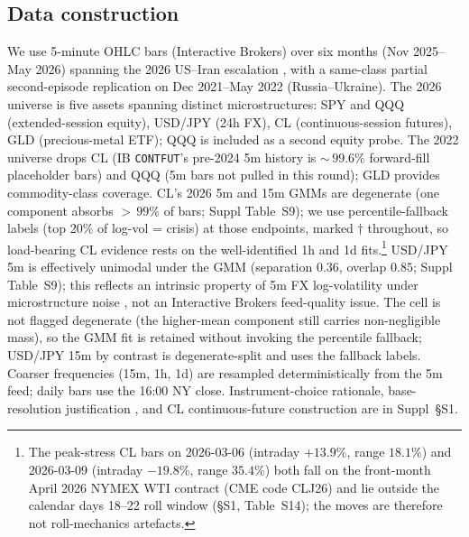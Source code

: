 \documentclass[preprint,12pt,authoryear]{elsarticle}
\newcommand{\SPY}{SPY}
\newcommand{\CL}{CL}
\newcommand{\USDJPY}{USD/JPY}
\newcommand{\GLD}{GLD}
\begin{document}
\subsection{Data construction}\label{sec:methods_data}
We use 5-minute OHLC bars (Interactive Brokers) over six months (Nov 2025--May 2026) spanning the 2026 US--Iran escalation \citep{ReutersIranMarkets2026Feb28,CaldaraIacoviello2022}, with a same-class partial second-episode replication on Dec 2021--May 2022 (Russia--Ukraine). The 2026 universe is five assets spanning distinct microstructures: \SPY{} and QQQ (extended-session equity), \USDJPY{} (24h FX), \CL{} (continuous-session futures), \GLD{} (precious-metal ETF); QQQ is included as a second equity probe. The 2022 universe drops \CL{} (IB \texttt{CONTFUT}'s pre-2024 5m history is ${\sim}\,99.6\%$ forward-fill placeholder bars) and QQQ (5m bars not pulled in this round); \GLD{} provides commodity-class coverage. \CL{}'s 2026 5m and 15m GMMs are degenerate (one component absorbs ${>}\,99\%$ of bars; Suppl Table~S9); we use percentile-fallback labels (top 20\% of log-vol = crisis) at those endpoints, marked $\dagger$ throughout, so load-bearing CL evidence rests on the well-identified 1h and 1d fits.\footnote{The peak-stress \CL{} bars on 2026-03-06 (intraday $+13.9\%$, range $18.1\%$) and 2026-03-09 (intraday $-19.8\%$, range $35.4\%$) both fall on the front-month April 2026 NYMEX WTI contract (CME code CLJ26) and lie outside the calendar days 18--22 roll window (\S{}S1, Table~S14); the moves are therefore not roll-mechanics artefacts.} \USDJPY{} 5m is effectively unimodal under the GMM (separation $0.36$, overlap $0.85$; Suppl Table~S9); this reflects an intrinsic property of 5m FX log-volatility under microstructure noise \citep{AitSahaliaMykland2005,GencaySelcukWhitcher2001}, not an Interactive Brokers feed-quality issue. The cell is not flagged degenerate (the higher-mean component still carries non-negligible mass), so the GMM fit is retained without invoking the percentile fallback; \USDJPY{} 15m by contrast is degenerate-split and uses the fallback labels. Coarser frequencies (15m, 1h, 1d) are resampled deterministically from the 5m feed; daily bars use the 16:00 NY close. Instrument-choice rationale, base-resolution justification \citep{AitSahaliaMykland2005,Andersen1999RealizedVolatility}, and \CL{} continuous-future construction are in Suppl~\S{}S1.
\end{document}
